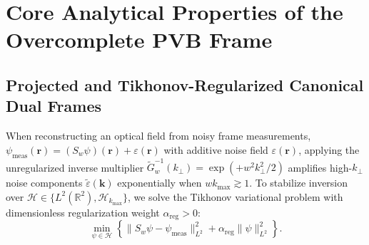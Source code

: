 \documentclass[aps,pra,onecolumn,notitlepage,11pt,tightenlines,amsmath,amssymb,floatfix,longbibliography]{revtex4-2}
\providecommand{\norm}[1]{\lVert#1\rVert}
\begin{document}
\section{Core Analytical Properties of the Overcomplete PVB Frame}
\label{sec:properties}

\subsection{Projected and Tikhonov-Regularized Canonical Dual Frames}
\label{subsec:tikhonov_dual}

When reconstructing an optical field from noisy frame measurements, $\psi_{\mathrm{meas}}(\mathbf{r}) = (S_w\psi)(\mathbf{r}) + \varepsilon(\mathbf{r})$ with additive noise field $\varepsilon(\mathbf{r})$, applying the unregularized inverse multiplier $\widetilde{G}_w^{-1}(k_\perp) = \exp(+w^2 k_\perp^2/2)$ amplifies high-$k_\perp$ noise components $\widetilde{\varepsilon}(\mathbf{k})$ exponentially when $w k_{\max} \gtrsim 1$. To stabilize inversion over $\mathcal{H} \in \{L^2(\mathbb{R}^2), \mathcal{H}_{k_{\max}}\}$, we solve the Tikhonov variational problem with dimensionless regularization weight $\alpha_{\mathrm{reg}} > 0$:
\begin{equation}
\min_{\psi \in \mathcal{H}} \left\{ \norm{S_w\psi - \psi_{\mathrm{meas}}}_{L^2}^2 + \alpha_{\mathrm{reg}}\norm{\psi}_{L^2}^2 \right\}.
\label{eq:tikhonov_opt}
\end{equation}
\end{document}
